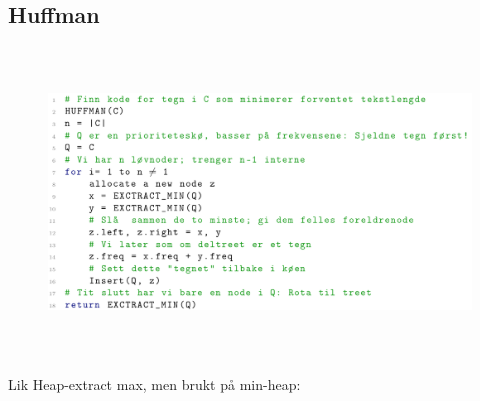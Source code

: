 \documentclass[12pt]{report}
\begin{document}




\newpage
\par

\subsection*{Huffman}



\begin{figure}[H]
	\begin{Center}
		\includegraphics[width=6.3in,height=3.22in]{./media/image181.png}
	\end{Center}
\end{figure}



\par


\vspace{\baselineskip}
{\fontsize{13pt}{15.6pt}\selectfont Lik Heap-extract max, men brukt på min-heap:\par}\par


\vspace{\baselineskip}


\end{document}
